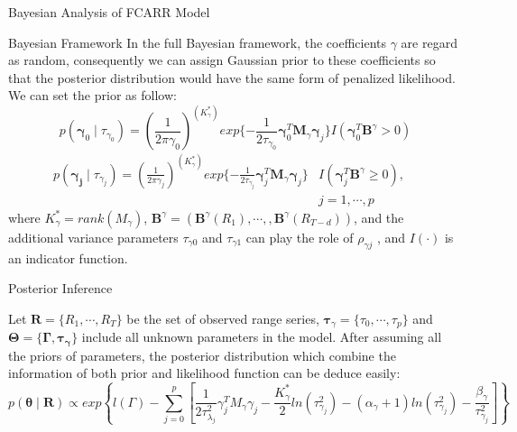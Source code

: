 \documentclass{beamer}
\begin{document}
\begin{frame}{Bayesian Analysis of FCARR Model}
\begin{block}{Bayesian Framework}
In the full Bayesian framework, the coefficients $\gamma$ are regard as random, consequently we can assign Gaussian prior to these coefficients so that the posterior distribution would have the same form of penalized likelihood. We can set the prior as follow:
\begin{equation}
    p(\bm{\gamma}_0 \mid \tau_{\gamma_0}) = (\frac{1}{2 \pi \gamma_0})^{(K_\gamma ^ *)} exp\{-\frac{1}{2 \tau_{\gamma_0} } \bm{\gamma}_0^T \bm{M}_\gamma \bm{\gamma}_j \}I(\bm{\gamma}_0^T \bm{B}^\gamma > 0)
\end{equation}
\begin{equation}
\begin{aligned}
    p(\bm{\gamma_j} \mid \tau_{\gamma_j}) = (\frac{1}{2 \pi \gamma_j})^{(K_{\gamma}^*)} exp \{ -\frac{1}{2\tau_{\gamma_j}}\bm{\gamma}_j^T \bm{M}_\gamma \bm{\gamma}_j \}&I(\bm{\gamma}_j^T \bm{B}^\gamma \geq 0),  \quad\\
    &j=1, \cdots ,p
\end{aligned}    
\end{equation}
where $K_{\gamma}^{*}=rank(M_{\gamma})$, $\bm{B}^{\gamma} = (\bm{B}^{\gamma}(R_1), \cdots, , \bm{B}^{\gamma}(R_{T-d}))$, and the additional variance parameters $\tau_{\gamma 0}$ and $\tau_{\gamma 1}$ can play the role of $\rho_{\gamma j}$ , and $I(\cdot)$ is an indicator function.
\end{block}
\end{frame}

\begin{frame}{Posterior Inference}
\begin{block}{}
Let $\bm{R} = \{ R_1, \cdots, R_T\}$ be the set of observed range series, $\bm{\tau}_{\gamma} = \{\tau_0, \cdots, \tau_p\}$ and $\bm{\Theta} = \{ \bm{\Gamma}, \bm{\tau_{\gamma}}\}$ include all unknown parameters in the model. After assuming all the priors of parameters, the posterior distribution which combine the information of both prior and likelihood function can be deduce easily:
\begin{equation}
    p(\bm{\theta} \mid \bm{R}) \propto exp \left\{ l(\Gamma) - \sum_{j=0}^p[\frac{1}{2 \tau_{\lambda_j}^2}\gamma_j^T M_{\gamma} \gamma_j - \frac{K_{\gamma}^{*}}{2} ln(\tau_{\gamma_j}^2) - (\alpha_{\gamma} +1) ln(\tau_{\gamma_j}^2) - \frac{\beta_{\gamma}}{\tau_{\gamma_j}^2}] \right\}
\end{equation}
\end{block}
\end{frame}
\end{document}
